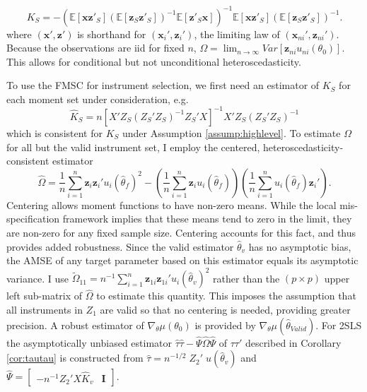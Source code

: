 \documentclass[12pt]{article}
\newcommand{\expect}{\mathbb{E}}
\theoremstyle{definition}
\begin{document}
\begin{equation}
	K_S = - \left( \expect\left[\mathbf{x}\mathbf{z}'_S\right]\left(\expect[\mathbf{z}_S\mathbf{z}'_S] \right)^{-1} \expect\left[\mathbf{z}'_S \mathbf{x}\right]\right)^{-1} \expect\left[\mathbf{x}\mathbf{z}'_S\right]\left(\expect[\mathbf{z}_S\mathbf{z}'_S]\right)^{-1}. 
\end{equation}
where $\left(\mathbf{x}', \mathbf{z}'\right)$ is shorthand for $\left(\mathbf{x}_i', \mathbf{z}_i'\right)$, the limiting law of  $\left(\mathbf{x}_{ni}', \mathbf{z}_{ni}'\right)$. Because the observations are iid for fixed $n$, $\Omega = \lim_{n\rightarrow \infty} Var\left[\mathbf{z}_{ni}u_{ni}(\theta_0)  \right]$. This allows for conditional but not unconditional heteroscedasticity.

To use the FMSC for instrument selection, we first need an estimator of $K_S$ for each moment set under consideration, e.g.\
\begin{equation}
	\widehat{K}_S = n \left[X' Z_S\left(Z_S'Z_S\right)^{-1}Z_S' X\right]^{-1} X' Z_S\left(Z_S'Z_S\right)^{-1} 
\end{equation}
which is consistent for $K_S$ under Assumption \ref{assump:highlevel}. To estimate $\Omega$ for all but the valid instrument set, I employ the centered, heteroscedasticity-consistent estimator
	$$\widehat{\Omega}= \frac{1}{n}\sum_{i=1}^n \mathbf{z}_i \mathbf{z}_i' u_i(\widehat{\theta}_f)^2 - \left(\frac{1}{n}\sum_{i=1}^n \mathbf{z}_i u_i(\widehat{\theta}_f)  \right)\left(\frac{1}{n}\sum_{i=1}^n  u_i(\widehat{\theta}_f)\mathbf{z}_i'  \right).$$
Centering allows moment functions to have non-zero means. While the local mis-specification framework implies that these means tend to zero in the limit, they are non-zero for any fixed sample size. Centering accounts for this fact, and thus provides added robustness. Since the valid estimator $\widehat{\theta}_v$ has no asymptotic bias, the AMSE of any target parameter based on this estimator equals its asymptotic variance. I use $\widetilde{\Omega}_{11}= n^{-1}\sum_{i=1}^n \mathbf{z}_{1i}\mathbf{z}_{1i}'u_i(\widehat{\theta}_v)^2$ rather than the $(p\times p)$ upper left sub-matrix of $\widehat{\Omega}$ to estimate this quantity. This imposes the assumption that all instruments in $Z_1$ are valid so that no centering is needed, providing greater precision. A robust estimator of $\nabla_{\theta}\mu(\theta_0)$ is provided by $\nabla_{\theta}\mu(\widehat{\theta}_{Valid})$. For 2SLS the asymptotically unbiased estimator $\widehat{\tau}\widehat{\tau} - \widehat{\Psi}\widehat{\Omega}\widehat{\Psi}$ of $\tau\tau'$ described in Corollary \ref{cor:tautau} is constructed from $\widehat{\tau} = n^{-1/2} \; Z_2' \; u(\hat{\theta}_{v})$ and $\widehat{\Psi} =  \left[ \begin{array}{cc} -n^{-1}Z_2'X \widehat{K}_{v} & \mathbf{I}\end{array}\right].$
\end{document}
